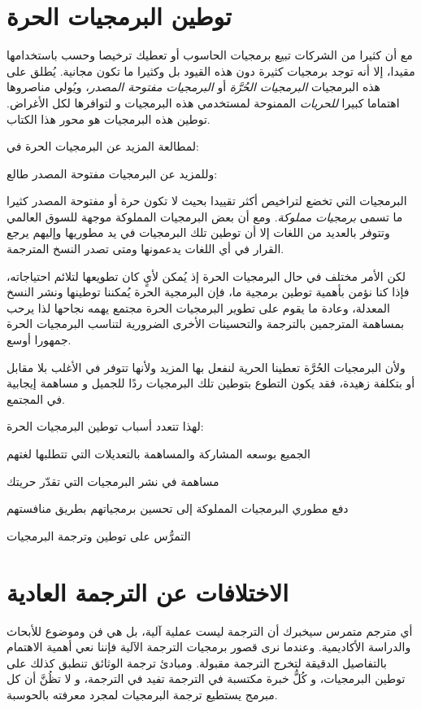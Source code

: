 \section{توطين البرمجيات الحرة}
مع أن كثيرا من الشركات تبيع برمجيات الحاسوب أو تعطيك ترخيصا وحسب
باستخدامها مقيدا، إلا أنه توجد برمجيات كثيرة دون هذه القيود بل وكثيرا
ما تكون مجانية. يُطلق على هذه البرمجيات {\it البرمجيات الحُرَّة} أو
{\it البرمجيات مفتوحة المصدر}، ويُولي مناصروها اهتماما كبيرا {\it
للحريات} الممنوحة لمستخدمي هذه البرمجيات و لتوافرها لكل الأغراض. توطين
هذه البرمجيات هو محور هذا الكتاب.

لمطالعة المزيد عن البرمجيات الحرة في:

وللمزيد عن البرمجيات مفتوحة المصدر طالع:

البرمجيات التي تخضع لتراخيص أكثر تقييدا بحيث لا تكون حرة أو مفتوحة
المصدر كثيرا ما تسمى {\it برمجيات مملوكة}. ومع أن بعض البرمجيات
المملوكة موجهة للسوق العالمي وتتوفر بالعديد من اللغات إلا أن توطين تلك
البرمجيات في يد مطوريها وإليهم يرجع القرار في أي اللغات يدعمونها ومتى
تصدر النسخ المترجمة.

لكن الأمر مختلف في حال البرمجيات الحرة إذ يُمكن لأيٍ كان تطويعها لتلائم
احتياجاته، فإذا كنا نؤمن بأهمية توطين برمجية ما، فإن البرمجية الحرة
يُمكننا توطينها ونشر النسخ المعدلة، وعادة ما يقوم على تطوير البرمجيات
الحرة مجتمع يهمه نجاحها لذا يرحب بمساهمة المترجمين بالترجمة والتحسينات
الأخرى الضرورية لتناسب البرمجيات الحرة جمهورا أوسع. 

ولأن البرمجيات الحُرَّة تعطينا الحرية لنفعل بها المزيد ولأنها تتوفر في
الأغلب بلا مقابل أو بتكلفة زهيدة، فقد يكون التطوع بتوطين تلك البرمجيات
ردًا للجميل و مساهمة إيجابية في المجتمع.

لهذا تتعدد أسباب توطين البرمجيات الحرة:

\startitemize[1]
\item الجميع بوسعه المشاركة والمساهمة بالتعديلات التي تتطلبها لغتهم
\item مساهمة في نشر البرمجيات التي تقدّر حريتك
\item دفع مطوري البرمجيات المملوكة إلى تحسين برمجياتهم بطريق منافستهم
\item التمرُّس على توطين وترجمة البرمجيات
\stopitemize
\section{الاختلافات عن الترجمة العادية}
أي مترجم متمرس سيخبرك أن الترجمة ليست عملية آلية، بل هي فن وموضوع
للأبحاث والدراسة الأكاديمية. وعندما نرى قصور برمجيات الترجمة الآلية
فإننا نعي أهمية الاهتمام بالتفاصيل الدقيقة لتخرج الترجمة مقبولة. ومبادئ
ترجمة الوثائق تنطبق كذلك على توطين البرمجيات، و كُلُّ خبرة مكتسبة في
الترجمة تفيد في الترجمة، و لا تظُنَّ أن كل مبرمج يستطيع ترجمة البرمجيات
لمجرد معرفته بالحوسبة.

